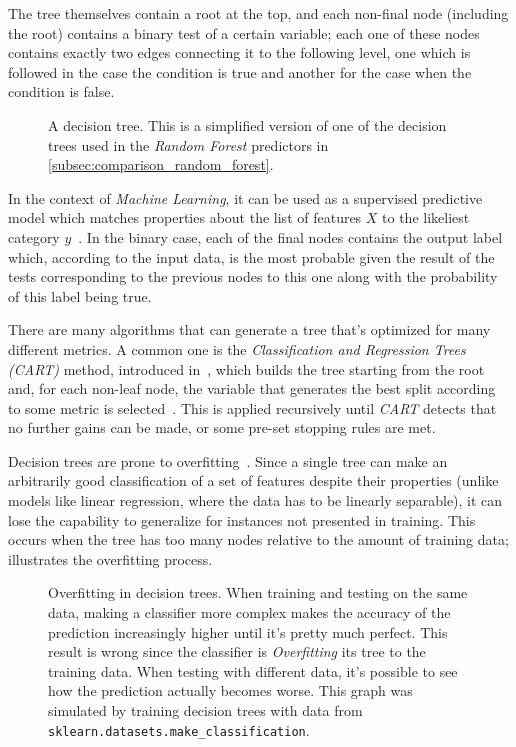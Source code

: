 The tree themselves contain a root at the top, and each non-final node (including the root) contains a binary test of a certain variable; each one of these nodes contains exactly two edges connecting it to the following level, one which is followed in the case the condition is true and another for the case when the condition is false.

\begin{figure}
\centering
{}
\caption{A decision tree. This is a simplified version of one of the decision trees used in the \emph{Random Forest} predictors in \cref{subsec:comparison_random_forest}.}
\label{fig:decision_tree}
\end{figure}

In the context of \emph{Machine Learning}, it can be used as a supervised predictive model which matches properties about the list of features $X$ to the likeliest category $y$~\cite{oded2008decisiontrees}. In the binary case, each of the final nodes contains the output label which, according to the input data, is the most probable given the result of the tests corresponding to the previous nodes to this one along with the probability of this label being true.

There are many algorithms that can generate a tree that's optimized for many different metrics. A common one is the \emph{Classification and Regression Trees (CART)} method, introduced in~\cite{breiman1993classification}, which builds the tree starting from the root and, for each non-leaf node, the variable that generates the best split according to some metric is selected~\cite{loh2011classification}. This is applied recursively until \emph{CART} detects that no further gains can be made, or some pre-set stopping rules are met.

Decision trees are prone to overfitting~\cite{oded2008decisiontrees}. Since a single tree can make an arbitrarily good classification of a set of features despite their properties (unlike models like linear regression, where the data has to be linearly separable), it can lose the capability to generalize for instances not presented in training. This occurs when the tree has too many nodes relative to the amount of training data;  illustrates the overfitting process.

\begin{figure}
\centering
{}
	\caption{Overfitting in decision trees. When training and testing on the same data, making a classifier more complex makes the accuracy of the prediction increasingly higher until it's pretty much perfect. This result is wrong since the classifier is \emph{Overfitting} its tree to the training data. When testing with different data, it's possible to see how the prediction actually becomes worse. This graph was simulated by training decision trees with data from \texttt{sklearn.datasets.make\_classification}\cite{sklearn_make_classification}.}
\label{fig:decisiontreeoverfitting}
\end{figure}

